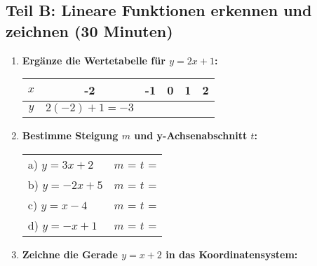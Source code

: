 \subsection*{Teil B: Lineare Funktionen erkennen und zeichnen (30 Minuten)}

\begin{enumerate}[label=\arabic*., resume]

    \item \textbf{Ergänze die Wertetabelle für $y = 2x + 1$:}
    \vspace{0.5cm}

    \begin{center}
        \begin{tabular}{|c|c|c|c|c|c|}
            \hline
            $x$ & -2 & -1 & 0 & 1 & 2 \\
            \hline
            $y$ & $2(-2)+1=-3$ & \phantom{-3} & \phantom{-3} & \phantom{-3} & \phantom{-3} \\
            \hline
        \end{tabular}
    \end{center}

    \vspace{1cm}

    \item \textbf{Bestimme Steigung $m$ und y-Achsenabschnitt $t$:}
    \vspace{0.5cm}

    \begin{tabular}{ll}
        a) $y = 3x + 2$ & $m$ = \underline{\hspace{1.5cm}} $t$ = \underline{\hspace{1.5cm}} \\[2ex]
        b) $y = -2x + 5$ & $m$ = \underline{\hspace{1.5cm}} $t$ = \underline{\hspace{1.5cm}} \\[2ex]
        c) $y = x - 4$ & $m$ = \underline{\hspace{1.5cm}} $t$ = \underline{\hspace{1.5cm}} \\[2ex]
        d) $y = -x + 1$ & $m$ = \underline{\hspace{1.5cm}} $t$ = \underline{\hspace{1.5cm}}
    \end{tabular}

    \vspace{1cm}

    \item \textbf{Zeichne die Gerade $y = x + 2$ in das Koordinatensystem:}
    \vspace{0.5cm}


\end{enumerate}
